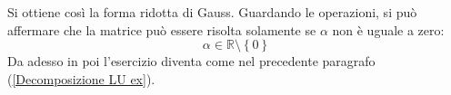 \documentclass[a4paper]{article}
\begin{document}
	Si ottiene così la forma ridotta di Gauss. Guardando le operazioni, si può affermare che la matrice può essere risolta solamente se $\alpha$ non è uguale a zero:
	\begin{equation*}
		\alpha \in \mathbb{R} \setminus \left\{0\right\}
	\end{equation*}
	Da adesso in poi l'esercizio diventa come nel precedente paragrafo (\ref{Decomposizione LU ex}).
\end{document}

